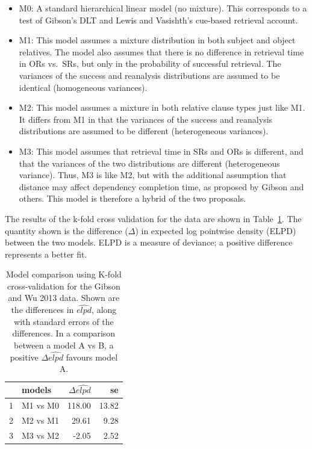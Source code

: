 \documentclass{cambridge7A}\usepackage[]{graphicx}\usepackage[]{color}
\begin{document}
\begin{itemize}
\item M0: A standard hierarchical linear model (no mixture). This corresponds to a test of Gibson's DLT and Lewis and Vasishth's cue-based retrieval account.
\item M1: This model assumes a mixture distribution in both subject and object relatives. The model also assumes
that there is no difference in retrieval time in ORs vs.\ SRs, but only in the probability of successful retrieval. The variances of the success and reanalysis distributions are assumed to be identical (homogeneous variances). 
\item M2: This model assumes a mixture in both relative clause types just like M1. It differs from M1 in that the variances of the success and reanalysis distributions are assumed to be different (heterogeneous variances).
\item M3: This model assumes that retrieval time in SRs and ORs is different, and that the variances of the two distributions are different (heterogeneous variance). Thus, M3 is like M2, but with the additional assumption that distance may affect dependency completion time, as proposed by Gibson and others. This model is therefore a hybrid of the two proposals.
\end{itemize}

The results of the k-fold cross validation for the \cite{gibsonwu} data are shown in Table~\ref{tab:modcompgibsonwu}. The quantity shown is the difference ($\Delta$) in expected log pointwise density (ELPD) between the two models. ELPD is  a measure of deviance; a positive  difference represents a better fit.

\begin{table}[!htbp]
\centering
\begin{tabular}{rlrr}
  \hline
 & models & $\Delta \widehat{elpd}$ & se \\ 
  \hline
1 & M1 vs M0 & 118.00 & 13.82 \\ 
  2 & M2 vs M1 & 29.61 & 9.28 \\ 
  3 & M3 vs M2 & -2.05 & 2.52 \\ 
   \hline
\end{tabular}
\caption{Model comparison using K-fold cross-validation for the Gibson and Wu 2013 data. Shown are the differences in $\widehat{elpd}$, along with standard errors of the differences. In a comparison between a model A vs B, a positive $\Delta\widehat{elpd}$ favours model A.} 
\label{tab:modcompgibsonwu}
\end{table}
\end{document}
